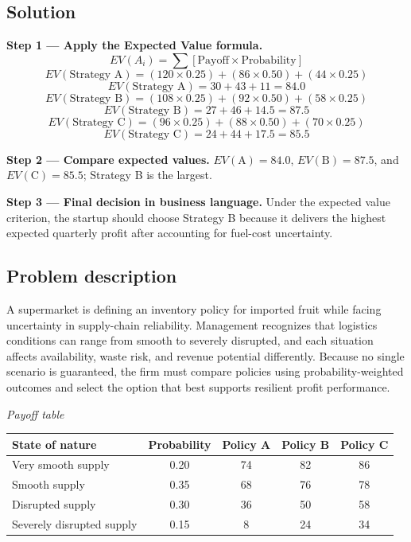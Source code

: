 \begin{ExamProblems}
		\subsection*{Solution}
		\textbf{Step 1 --- Apply the Expected Value formula.}
		\[
		EV(A_i)=\sum [\text{Payoff}\times\text{Probability}]
		\]
		\[
		EV(\text{Strategy A})=(120\times0.25)+(86\times0.50)+(44\times0.25)
		\]
		\[
		EV(\text{Strategy A})=30+43+11=84.0
		\]
		\[
		EV(\text{Strategy B})=(108\times0.25)+(92\times0.50)+(58\times0.25)
		\]
		\[
		EV(\text{Strategy B})=27+46+14.5=87.5
		\]
		\[
		EV(\text{Strategy C})=(96\times0.25)+(88\times0.50)+(70\times0.25)
		\]
		\[
		EV(\text{Strategy C})=24+44+17.5=85.5
		\]
		
		\textbf{Step 2 --- Compare expected values.}
		$EV(\text{A})=84.0$, $EV(\text{B})=87.5$, and $EV(\text{C})=85.5$; Strategy B is the largest.
		
		\textbf{Step 3 --- Final decision in business language.}
		Under the expected value criterion, the startup should choose Strategy B because it delivers the highest expected quarterly profit after accounting for fuel-cost uncertainty.
		
		\item
		\subsection*{Problem description}
		A supermarket is defining an inventory policy for imported fruit while facing uncertainty in supply-chain reliability. Management recognizes that logistics conditions can range from smooth to severely disrupted, and each situation affects availability, waste risk, and revenue potential differently. Because no single scenario is guaranteed, the firm must compare policies using probability-weighted outcomes and select the option that best supports resilient profit performance.

		\begin{center}
			\textit{Payoff table} \par
			\begin{tabular}{l c c c c}
				\toprule
				State of nature & Probability & Policy A & Policy B & Policy C \\
				\midrule
				Very smooth supply & 0.20 & 74 & 82 & 86 \\
				Smooth supply & 0.35 & 68 & 76 & 78 \\
				Disrupted supply & 0.30 & 36 & 50 & 58 \\
				Severely disrupted supply & 0.15 & 8 & 24 & 34 \\
				\bottomrule
			\end{tabular}
		\end{center}


\end{ExamProblems}
